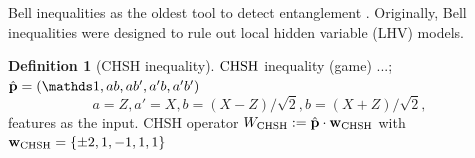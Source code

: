 \documentclass[
reprint,
aps,
pra,
floatfix,
]{revtex4-2}
\theoremstyle{plain}
\theoremstyle{definition}
\newtheorem{definition}{Definition}
\newcommand{\ew}{W}
\newcommand{\chsh}{\textup{CHSH}}
\newcommand{\px}{X}
\newcommand{\pz}{Z}
\begin{document}
Bell inequalities as the oldest tool to detect entanglement \cite{terhalBellInequalitiesSeparability2000}.
Originally, Bell inequalities were designed to rule out local hidden variable (LHV) models.
\begin{definition}[CHSH inequality]\label{def:chsh_inequality}
	$\chsh$ inequality (game) ...; 
	$\hat{\vb{p}}=\qty(\identity, a b, a b', a' b, a' b' )$
	\begin{equation}
		a = \pz, a' = \px, 
		b = (\px-\pz)/\sqrt{2},
		b = (\px+\pz)/\sqrt{2},
		\label{eq:chsh}
	\end{equation}
	features as the input.
	CHSH operator $\ew_{\chsh}:=\hat{\vb{p}}\cdot\vb{w}_{\chsh}$ with 
	$\vb{w}_{\chsh} = \qty{\pm 2, 1, -1, 1, 1}$
\end{definition}
\end{document}
